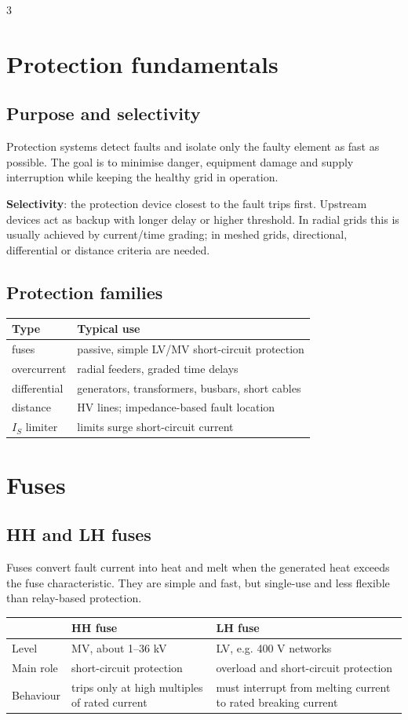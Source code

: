 \documentclass[9pt, landscape, a4paper]{article}
\begin{document}
\begin{multicols*}{3}
\section{Protection fundamentals}
\subsection{Purpose and selectivity}
Protection systems detect faults and isolate only the faulty element as fast as
possible. The goal is to minimise danger, equipment damage and supply
interruption while keeping the healthy grid in operation.

\textbf{Selectivity}: the protection device closest to the fault trips first.
Upstream devices act as backup with longer delay or higher threshold. In radial
grids this is usually achieved by current/time grading; in meshed grids,
directional, differential or distance criteria are needed.

\subsection{Protection families}
\begin{tabularx}{\columnwidth}{@{}lX@{}}
  \toprule
  \textbf{Type} & \textbf{Typical use}\\
  \midrule
  fuses & passive, simple LV/MV short-circuit protection\\
  overcurrent & radial feeders, graded time delays\\
  differential & generators, transformers, busbars, short cables\\
  distance & HV lines; impedance-based fault location\\
  $I_S$ limiter & limits surge short-circuit current\\
  \bottomrule
\end{tabularx}

\section{Fuses}
\subsection{HH and LH fuses}
Fuses convert fault current into heat and melt when the generated heat exceeds
the fuse characteristic. They are simple and fast, but single-use and less
flexible than relay-based protection.

\begin{tabularx}{\columnwidth}{@{}lXX@{}}
  \toprule
  & \textbf{HH fuse} & \textbf{LH fuse}\\
  \midrule
  Level & MV, about 1--36 kV & LV, e.g. 400 V networks\\
  Main role & short-circuit protection & overload and short-circuit protection\\
  Behaviour & trips only at high multiples of rated current & must interrupt from melting current to rated breaking current\\
  \bottomrule
\end{tabularx}


\end{multicols*}
\end{document}
